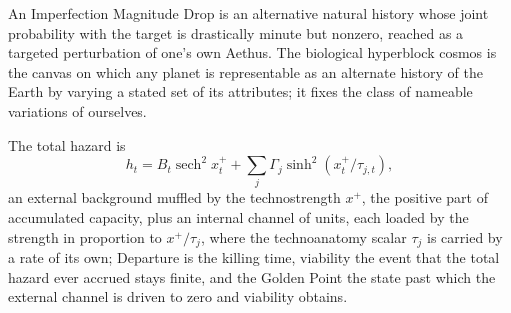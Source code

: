 \begin{definition}
\label{imp:imd}
An Imperfection Magnitude Drop is an alternative natural history whose
joint probability with the target is drastically minute but nonzero,
reached as a targeted perturbation of one's own Aethus. The biological
hyperblock cosmos is the canvas on which any planet is representable as
an alternate history of the Earth by varying a stated set of its
attributes; it fixes the class of nameable variations of ourselves.
\end{definition}

\begin{definition}
\label{imp:goldenpoint}
The total hazard is
\[
h_t=B_t\operatorname{sech}^2x_t^++\sum_j\Gamma_j\sinh^2(x_t^+/\tau_{j,t}),
\]
an external background muffled by the technostrength $x^+$, the positive
part of accumulated capacity, plus an internal channel of units, each
loaded by the strength in proportion to $x^+/\tau_j$, where the
technoanatomy scalar $\tau_j$ is carried by a rate of its own; Departure
is the killing time, viability the event that the total hazard ever
accrued stays finite, and the Golden Point the state past which the
external channel is driven to zero and viability obtains.
\end{definition}

